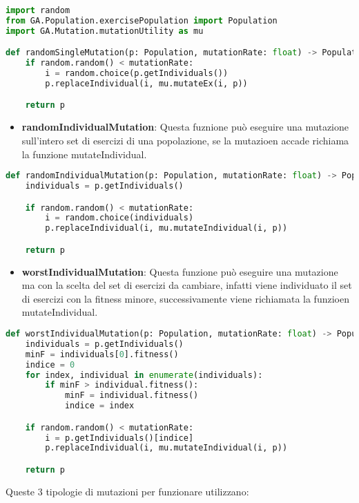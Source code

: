 \documentclass{article}
\begin{document}
\begin{lstlisting}[language=Python, breaklines, no caption]
import random
from GA.Population.exercisePopulation import Population
import GA.Mutation.mutationUtility as mu

def randomSingleMutation(p: Population, mutationRate: float) -> Population:
    if random.random() < mutationRate:
        i = random.choice(p.getIndividuals())
        p.replaceIndividual(i, mu.mutateEx(i, p))

    return p
\end{lstlisting}

\begin{itemize}
\item\textbf{randomIndividualMutation}: Questa fuznione può eseguire una mutazione sull'intero set di esercizi di una popolazione, se la mutazioen accade richiama la funzione mutateIndividual.
\end{itemize}

\begin{lstlisting}[language=Python, breaklines, no caption]
def randomIndividualMutation(p: Population, mutationRate: float) -> Population:
    individuals = p.getIndividuals()

    if random.random() < mutationRate:
        i = random.choice(individuals)
        p.replaceIndividual(i, mu.mutateIndividual(i, p))

    return p
\end{lstlisting}

\pagebreak

\begin{itemize}
\item\textbf{worstIndividualMutation}: Questa funzione può eseguire una mutazione ma con la scelta del set di esercizi da cambiare, infatti viene individuato il set di esercizi con la fitness minore, successivamente viene richiamata la funzioen mutateIndividual.
\end{itemize}

\begin{lstlisting}[language=Python, breaklines, no caption]
def worstIndividualMutation(p: Population, mutationRate: float) -> Population:
    individuals = p.getIndividuals()
    minF = individuals[0].fitness()
    indice = 0
    for index, individual in enumerate(individuals):
        if minF > individual.fitness():
            minF = individual.fitness()
            indice = index

    if random.random() < mutationRate:
        i = p.getIndividuals()[indice]
        p.replaceIndividual(i, mu.mutateIndividual(i, p))

    return p
        \end{lstlisting}
    Queste 3 tipologie di mutazioni per funzionare utilizzano:
\end{document}
